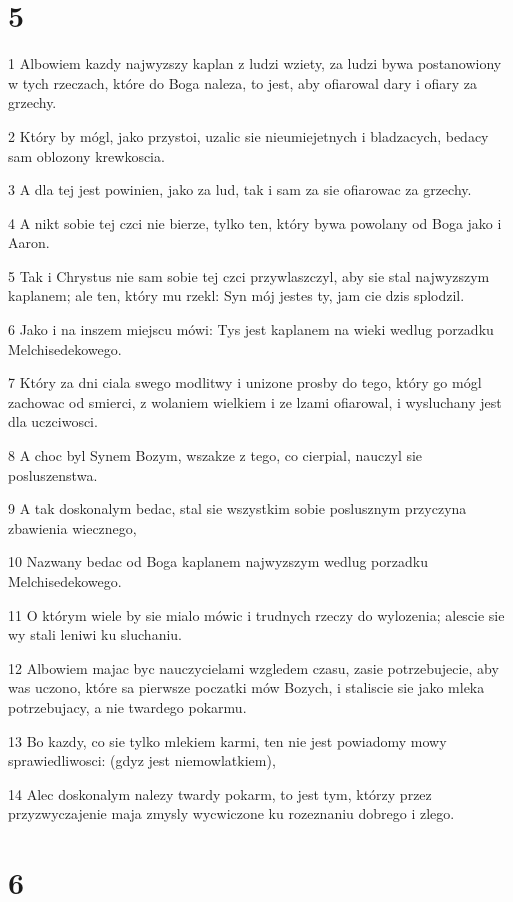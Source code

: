 \chapter{5}

\par 1 Albowiem kazdy najwyzszy kaplan z ludzi wziety, za ludzi bywa postanowiony w tych rzeczach, które do Boga naleza, to jest, aby ofiarowal dary i ofiary za grzechy.
\par 2 Który by mógl, jako przystoi, uzalic sie nieumiejetnych i bladzacych, bedacy sam oblozony krewkoscia.
\par 3 A dla tej jest powinien, jako za lud, tak i sam za sie ofiarowac za grzechy.
\par 4 A nikt sobie tej czci nie bierze, tylko ten, który bywa powolany od Boga jako i Aaron.
\par 5 Tak i Chrystus nie sam sobie tej czci przywlaszczyl, aby sie stal najwyzszym kaplanem; ale ten, który mu rzekl: Syn mój jestes ty, jam cie dzis splodzil.
\par 6 Jako i na inszem miejscu mówi: Tys jest kaplanem na wieki wedlug porzadku Melchisedekowego.
\par 7 Który za dni ciala swego modlitwy i unizone prosby do tego, który go mógl zachowac od smierci, z wolaniem wielkiem i ze lzami ofiarowal, i wysluchany jest dla uczciwosci.
\par 8 A choc byl Synem Bozym, wszakze z tego, co cierpial, nauczyl sie posluszenstwa.
\par 9 A tak doskonalym bedac, stal sie wszystkim sobie poslusznym przyczyna zbawienia wiecznego,
\par 10 Nazwany bedac od Boga kaplanem najwyzszym wedlug porzadku Melchisedekowego.
\par 11 O którym wiele by sie mialo mówic i trudnych rzeczy do wylozenia; alescie sie wy stali leniwi ku sluchaniu.
\par 12 Albowiem majac byc nauczycielami wzgledem czasu, zasie potrzebujecie, aby was uczono, które sa pierwsze poczatki mów Bozych, i staliscie sie jako mleka potrzebujacy, a nie twardego pokarmu.
\par 13 Bo kazdy, co sie tylko mlekiem karmi, ten nie jest powiadomy mowy sprawiedliwosci: (gdyz jest niemowlatkiem),
\par 14 Alec doskonalym nalezy twardy pokarm, to jest tym, którzy przez przyzwyczajenie maja zmysly wycwiczone ku rozeznaniu dobrego i zlego.

\chapter{6}

